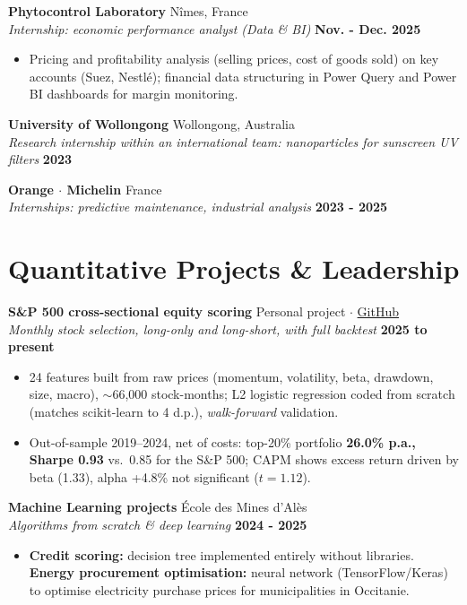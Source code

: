 \documentclass[a4paper,10pt]{article}
\newcommand{\cventry}[4]{
    \vspace{2pt}
    \noindent \textbf{#1} \hfill #2 \\
    \noindent \textit{#3} \hfill \textbf{#4}
}
\newenvironment{cvbullets}{
    \begin{itemize}[itemsep=1.5pt, topsep=2pt, leftmargin=1.1em, label=\tiny$\bullet$]
}{
    \end{itemize} \vspace{1pt}
}
\begin{document}
\cventry{Phytocontrol Laboratory}{Nîmes, France}{Internship: economic performance analyst (Data \& BI)}{Nov. - Dec. 2025}
\begin{cvbullets}
    \item Pricing and profitability analysis (selling prices, cost of goods sold) on key accounts (Suez, Nestlé); financial data structuring in Power Query and Power BI dashboards for margin monitoring.
\end{cvbullets}

\cventry{University of Wollongong}{Wollongong, Australia}{Research internship within an international team: nanoparticles for sunscreen UV filters}{2023}

\cventry{Orange $\cdot$ Michelin}{France}{Internships: predictive maintenance, industrial analysis}{2023 - 2025}
\vspace{3pt}

\section{Quantitative Projects \& Leadership}

\cventry{S\&P 500 cross-sectional equity scoring}{Personal project $\cdot$ \href{https://github.com/antojfr/sp500-quant-scoring}{GitHub}}{Monthly stock selection, long-only and long-short, with full backtest}{2025 to present}
\begin{cvbullets}
    \item 24 features built from raw prices (momentum, volatility, beta, drawdown, size, macro), $\sim$66,000 stock-months; L2 logistic regression coded from scratch (matches scikit-learn to 4 d.p.), \textit{walk-forward} validation.
    \item Out-of-sample 2019--2024, net of costs: top-20\% portfolio \textbf{26.0\% p.a., Sharpe 0.93} vs.\ 0.85 for the S\&P 500; CAPM shows excess return driven by beta (1.33), alpha +4.8\% not significant ($t = 1.12$).
\end{cvbullets}

\cventry{Machine Learning projects}{École des Mines d'Alès}{Algorithms \textit{from scratch} \& deep learning}{2024 - 2025}
\begin{cvbullets}
    \item \textbf{Credit scoring:} decision tree implemented entirely without libraries. \textbf{Energy procurement optimisation:} neural network (TensorFlow/Keras) to optimise electricity purchase prices for municipalities in Occitanie.
\end{cvbullets}
\end{document}
